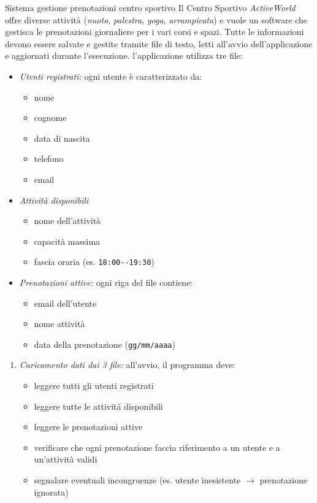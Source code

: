 \tikzexternaldisable
\begin{esercizioL}{Sistema gestione prenotazioni centro sportivo}
	Il Centro Sportivo \textit{ActiveWorld} offre diverse attività (\textit{nuoto}, \textit{palestra}, \textit{yoga}, \textit{arrampicata}) e vuole un software che gestisca le prenotazioni giornaliere per i vari corsi e spazi.
	Tutte le informazioni devono essere salvate e gestite tramite file di testo, letti all'avvio dell'applicazione e aggiornati durante l'esecuzione.
	\vskip3mm
	 l'applicazione utilizza tre file:
	\begin{itemize}
		\item \textit{Utenti registrati:} ogni utente è caratterizzato da:
		      \begin{itemize}
			      \item nome
			      \item cognome
			      \item data di nascita
			      \item telefono
			      \item email
		      \end{itemize}
		\item \textit{Attività disponibili}
		      \begin{itemize}
			      \item nome dell'attività
			      \item capacità massima
			      \item fascia oraria (es. \verb|18:00--19:30|)
		      \end{itemize}
		\item \textit{Prenotazioni attive:} ogni riga del file contiene:
		      \begin{itemize}
			      \item email dell'utente
			      \item nome attività
			      \item data della prenotazione (\verb|gg/mm/aaaa|)
		      \end{itemize}
	\end{itemize}

	\vskip3mm
	\begin{enumerate}
		\item \textit{Caricamento dati dai 3 file:} all'avvio, il programma deve:
		      \begin{itemize}
			      \item leggere tutti gli utenti registrati
			      \item leggere tutte le attività disponibili
			      \item leggere le prenotazioni attive
			      \item verificare che ogni prenotazione faccia riferimento a un utente e a un'attività validi
			      \item segnalare eventuali incongruenze (es. utente inesistente $\rightarrow$ prenotazione ignorata)
		      \end{itemize}


\end{enumerate}
\end{esercizioL}
